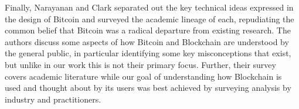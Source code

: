 Finally, Narayanan and Clark separated out the key technical ideas expressed in the design of Bitcoin and surveyed the academic lineage of each, repudiating the common belief that Bitcoin was a radical departure from existing research\cite{Narayanan17}. The authors discuss some aspects of how Bitcoin and Blockchain are understood by the general public, in particular identifying some key misconceptions that exist, but unlike in our work this is not their primary focus. Further, their survey covers academic literature while our goal of understanding how Blockchain is used and thought about by its users was best achieved by surveying analysis by industry and practitioners.